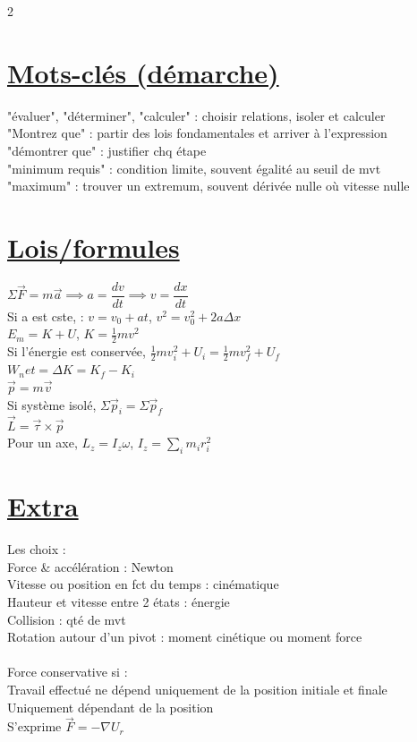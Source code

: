 \documentclass[11pt]{article}
\begin{document}
\begin{multicols}{2}
    \section{\underline{Mots-clés (démarche)}}
    "évaluer", "déterminer", "calculer" : choisir relations, isoler et calculer\\
    "Montrez que" : partir des lois fondamentales et arriver à l'expression\\
    "démontrer que" : justifier chq étape\\
    "minimum requis" : condition limite, souvent égalité au seuil de mvt\\
    "maximum" : trouver un extremum, souvent dérivée nulle où vitesse nulle\\

    \section{\underline{Lois/formules}}
    $\Sigma\vec{F}=m\vec{a} \implies a=\dfrac{dv}{dt} \implies v=\dfrac{dx}{dt}$\\
    Si a est cste, : $v=v_0+at$, $v^2=v_0^2+2a\Delta x$\\
    $E_m=K+U$, $K=\frac{1}{2}mv^2$\\
    Si l'énergie est conservée, $\frac{1}{2}mv_i^2+U_i=\frac{1}{2}mv_f^2+U_f$\\
    $W_net=\Delta K=K_f-K_i$\\
    $\vec{p}=m\vec{v}$\\
    Si système isolé, $\Sigma \vec{p}_i=\Sigma \vec{p}_f$\\
    $\vec{L}=\vec{\tau} \times \vec{p}$\\
    Pour un axe, $L_z=I_z\omega$, $I_z=\sum_i m_ir_i^2$\

    \section{\underline{Extra}}
    Les choix :\\
    Force \& accélération : Newton\\
    Vitesse ou position en fct du temps : cinématique\\
    Hauteur et vitesse entre 2 états : énergie\\
    Collision : qté de mvt\\
    Rotation autour d'un pivot : moment cinétique ou moment force\\ \\
    Force conservative si :\\
    Travail effectué ne dépend uniquement de la position initiale et finale\\
    Uniquement dépendant de la position\\
    S'exprime $\vec{F}=-\nabla U_r$\\

\end{multicols}
\end{document}
